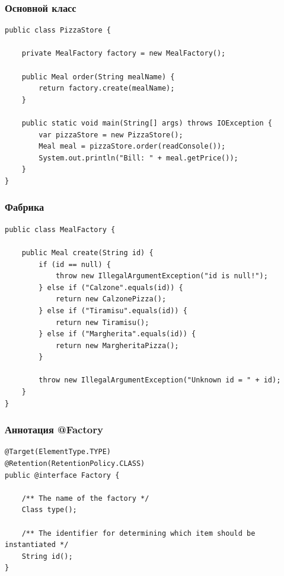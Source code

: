 \documentclass[xetex,mathserif,serif]{beamer}
\begin{document}
	\begin{frame}[fragile]
		\frametitle{Основной класс}
		\begin{small}
			\begin{verbatim}
public class PizzaStore {

    private MealFactory factory = new MealFactory();

    public Meal order(String mealName) {
        return factory.create(mealName);
    }

    public static void main(String[] args) throws IOException {
        var pizzaStore = new PizzaStore();
        Meal meal = pizzaStore.order(readConsole());
        System.out.println("Bill: " + meal.getPrice());
    }
}
			\end{verbatim}
		\end{small}
	\end{frame}

	\begin{frame}[fragile]
		\frametitle{Фабрика}
		\begin{small}
			\begin{verbatim}
public class MealFactory {

    public Meal create(String id) {
        if (id == null) {
            throw new IllegalArgumentException("id is null!");
        } else if ("Calzone".equals(id)) {
            return new CalzonePizza();
        } else if ("Tiramisu".equals(id)) {
            return new Tiramisu();
        } else if ("Margherita".equals(id)) {
            return new MargheritaPizza();
        }

        throw new IllegalArgumentException("Unknown id = " + id);
    }
}
			\end{verbatim}
		\end{small}
	\end{frame}

	\begin{frame}[fragile]
		\frametitle{Аннотация @Factory}
		\begin{small}
			\begin{verbatim}
@Target(ElementType.TYPE) 
@Retention(RetentionPolicy.CLASS)
public @interface Factory {

    /** The name of the factory */
    Class type();

    /** The identifier for determining which item should be instantiated */
    String id();
}
			\end{verbatim}
		\end{small}
	\end{frame}
\end{document}
